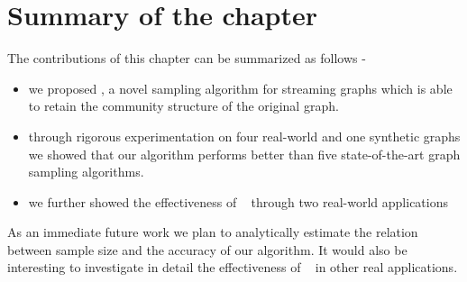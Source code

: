 

\section{Summary of the chapter}
The contributions of this chapter can be summarized as follows - 
\begin{itemize}
 \item we proposed \compas, a novel sampling algorithm for streaming graphs 
which is able to retain the community structure of the original graph.
 \item through rigorous experimentation on four real-world and one synthetic graphs we showed that our algorithm performs better than 
five state-of-the-art graph sampling algorithms.
 \item we further showed the effectiveness of \compas~ through two real-world applications
\end{itemize}
  
As an immediate future work we plan to analytically estimate the relation between sample size and the accuracy of our algorithm. 
It would also be interesting to investigate in detail the effectiveness of \compas~ in other real applications. 

